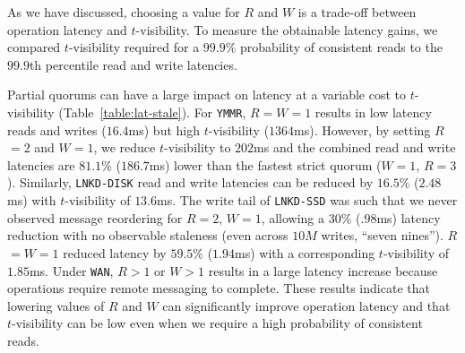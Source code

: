 \documentclass{vldb}
\begin{document}
As we have discussed, choosing a value for $R$ and $W$ is a trade-off
between operation latency and $t$-visibility. To measure the
obtainable latency gains, we compared $t$-visibility required for a
$99.9\%$ probability of consistent reads to the $99.9$th percentile
read and write latencies.

Partial quorums can have a large impact on latency at a variable cost
to $t$-visibility (Table~\ref{table:lat-stale}).  For \texttt{YMMR},
$R$$=$$W$$=$$1$ results in low latency reads and writes ($16.4$ms) but
high $t$-visibility ($1364$ms). However, by setting $R$$=$$2$ and
$W$$=$$1$, we reduce $t$-visibility to $202$ms and the combined read
and write latencies are $81.1\%$ ($186.7$ms) lower than the fastest
strict quorum ($W$$=$$1$, $R$$=$$3$).  Similarly, \texttt{LNKD-DISK}
read and write latencies can be reduced by $16.5\%$ ($2.48$ms) with
$t$-visibility of $13.6$ms.  The write tail of \texttt{LNKD-SSD} was
such that we never observed message reordering for $R$$=$$2$,
$W$$=$$1$, allowing a $30\%$ ($.98$ms) latency reduction with no
observable staleness (even across $10M$ writes, ``seven nines'').
$R$$=$$W$$=$$1$ reduced latency by $59.5\%$ ($1.94$ms) with a
corresponding $t$-visibility of $1.85$ms.  Under \texttt{WAN}, $R > 1$
or $W > 1$ results in a large latency increase because operations
require remote messaging to complete. These results indicate that
lowering values of $R$ and $W$ can significantly improve operation
latency and that $t$-visibility can be low even when we require a high
probability of consistent reads.
\end{document}
